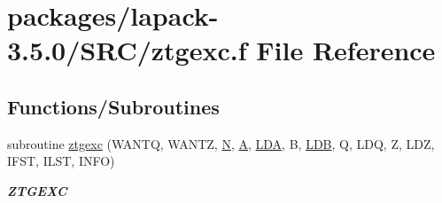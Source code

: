 \hypertarget{ztgexc_8f}{}\section{packages/lapack-\/3.5.0/\+S\+R\+C/ztgexc.f File Reference}
\label{ztgexc_8f}
\subsection*{Functions/\+Subroutines}
\begin{DoxyCompactItemize}
\item 
subroutine \hyperlink{group__complex16GEcomputational_ga8486feee84daa39f76895fadb230b108}{ztgexc} (W\+A\+N\+T\+Q, W\+A\+N\+T\+Z, \hyperlink{polmisc_8c_a0240ac851181b84ac374872dc5434ee4}{N}, \hyperlink{classA}{A}, \hyperlink{example__user_8c_ae946da542ce0db94dced19b2ecefd1aa}{L\+D\+A}, B, \hyperlink{example__user_8c_a50e90a7104df172b5a89a06c47fcca04}{L\+D\+B}, Q, L\+D\+Q, Z, L\+D\+Z, I\+F\+S\+T, I\+L\+S\+T, I\+N\+F\+O)
\begin{DoxyCompactList}\small\item\em {\bfseries Z\+T\+G\+E\+X\+C} \end{DoxyCompactList}\end{DoxyCompactItemize}
